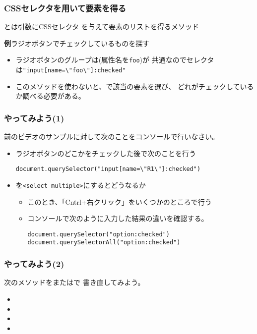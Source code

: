 \iffalse
\begin{frame}[containsverbatim]
 \frametitle{CSSセレクタの注意}
\begin{itemize}
 \item \Verb+E F+ と \Verb+E > F+ の違い
\end{itemize} 
\end{frame}
\fi
\begin{frame}[containsverbatim]
 \frametitle{CSSセレクタを用いて要素を得る}
 とは引数にCSSセレクタ
 を与えて要素のリストを得るメソッド
 
 {\bfseries 例}ラジオボタンでチェックしているものを探す

\begin{itemize}
 \item ラジオボタンのグループは(属性名を\texttt{foo})が
        共通なのでセレクタは\Verb+"input[name=\"foo\"]:checked"+
 \item このメソッドを使わないと、で該当の要素を選び、
       どれがチェックしているか調べる必要がある。
\end{itemize}        


\end{frame}
\begin{frame}[containsverbatim]
 \frametitle{やってみよう(1)}

 前のビデオのサンプルに対して次のことをコンソールで行いなさい。
 \begin{itemize}
 \item ラジオボタンのどこかをチェックした後で次のことを行う

        \Verb+document.querySelector("input[name=\"R1\"]:checked")+
  \item {}を\texttt{<select multiple>}にするとどうなるか
        \begin{itemize}
         \item このとき、「Cntrl+右クリック」をいくつかのところで行う
         \item コンソールで次のように入力した結果の違いを確認する。
               
               \texttt{document.querySelector("option:checked")}\\
               \texttt{document.querySelectorAll("option:checked")}
        \end{itemize}
 \end{itemize}
\end{frame}
\begin{frame}[containsverbatim]
 \frametitle{やってみよう(2)}
 次のメソッドをまたはで
 書き直してみよう。
\begin{itemize}
  \item {}
  \item {}
  \item {}
  \item {}
\end{itemize}
\end{frame}
